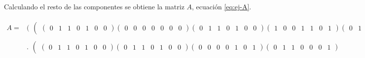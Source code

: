 Calculando el resto de las componentes se obtiene la matriz $A$, ecuación \ref{eq:ej-A}.

\begin{equation}\label{eq:ej-A}
	\begin{aligned}
	{A} = & \bigg(\begin{matrix}\left(\begin{matrix}
				\left(\begin{smallmatrix}
					0 & 1 & 1 & 0 & 1 & 0 & 0
				\end{smallmatrix}\right)
		
				\left(\begin{smallmatrix}
					0 & 0 & 0 & 0 & 0 & 0 & 0
				\end{smallmatrix}\right)
		
				\left(\begin{smallmatrix}
					0 & 1 & 1 & 0 & 1 & 0 & 0
				\end{smallmatrix}\right)
			
				\left(\begin{smallmatrix}
					1 & 0 & 0 & 1 & 1 & 0 & 1
				\end{smallmatrix}\right)
				
				\left(\begin{smallmatrix}
					0 & 1 & 1 & 0 & 0 & 0 & 1
				\end{smallmatrix}\right)
				
				\left(\begin{smallmatrix}
					0 & 0 & 0 & 0 & 1 & 0 & 1
				\end{smallmatrix}\right)
			\end{matrix}\right)\end{matrix}\bigg.\\
			&
			\bigg.\begin{matrix}\left(\begin{matrix}
				\left(\begin{smallmatrix}
					0 & 1 & 1 & 0 & 1 & 0 & 0
				\end{smallmatrix}\right)
		
				\left(\begin{smallmatrix}
					0 & 1 & 1 & 0 & 1 & 0 & 0
				\end{smallmatrix}\right)
		
				\left(\begin{smallmatrix}
					0 & 0 & 0 & 0 & 1 & 0 & 1
				\end{smallmatrix}\right)
				
				\left(\begin{smallmatrix}
					0 & 1 & 1 & 0 & 0 & 0 & 1
				\end{smallmatrix}\right)
				

\end{matrix}
\end{matrix}
\end{aligned}
\end{equation}
